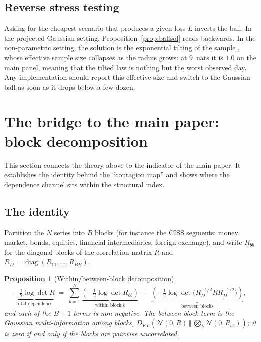 \documentclass[11pt]{article}
\newtheorem{proposition}{Proposition}
\theoremstyle{definition}
\theoremstyle{remark}
\newcommand{\KL}[2]{D_{KL}\!\left(#1\,\Vert\,#2\right)}
\begin{document}
\subsection{Reverse stress testing}

Asking for the cheapest scenario that produces a given loss $L$ inverts the ball.
In the projected Gaussian setting, Proposition~\ref{prop:ballsol} reads
backwards. In the non-parametric setting, the solution is the exponential
tilting of the sample \citep{csiszar1975}, whose effective sample size collapses
as the radius grows: at $9$~nats it is $1.0$ on the main panel, meaning that the
tilted law is nothing but the worst observed day. Any implementation should
report this effective size and switch to the Gaussian ball as soon as it drops
below a few dozen.

\section{The bridge to the main paper: block decomposition}
\label{sec:blocks}

This section connects the theory above to the indicator of the main paper. It
establishes the identity behind the ``contagion map'' and shows where the
dependence channel sits within the structural index.

\subsection{The identity}

Partition the $N$ series into $B$ blocks (for instance the CISS segments: money
market, bonds, equities, financial intermediaries, foreign exchange), and write
$R_{bb}$ for the diagonal blocks of the correlation matrix $R$ and
$R_D=\operatorname{diag}(R_{11},\dots,R_{BB})$.

\begin{proposition}[Within/between-block decomposition]
\label{prop:blocks}
\begin{equation}
\label{eq:blocks}
\underbrace{-\tfrac12\log\det R}_{\text{total dependence}}
\;=\;\sum_{b=1}^{B}\underbrace{\left(-\tfrac12\log\det R_{bb}\right)}_{\text{within block }b}
\;+\;\underbrace{\left(-\tfrac12\log\det\big(R_D^{-1/2}RR_D^{-1/2}\big)\right)}_{\text{between blocks}} ,
\end{equation}
and each of the $B+1$ terms is non-negative. The between-block term is the
Gaussian multi-information among blocks,
$\KL{\mathcal N(0,R)}{\bigotimes_b\mathcal N(0,R_{bb})}$; it is zero if and only
if the blocks are pairwise uncorrelated.
\end{proposition}
\end{document}
